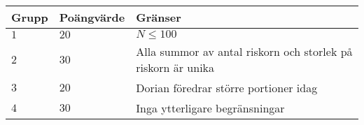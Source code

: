 \noindent
\begin{tabular}{| l | l | l |}
\hline
  Grupp & Poängvärde & Gränser \\ \hline
  $1$    & $20$       &  $N \leq 100$  \\ \hline 
  $2$    & $30$       &  Alla summor av antal riskorn och storlek på riskorn är unika \\ \hline 
  $3$    & $20$       &  Dorian föredrar större portioner idag \\ \hline
  $4$    & $30$       &  Inga ytterligare begränsningar \\ \hline
\end{tabular}